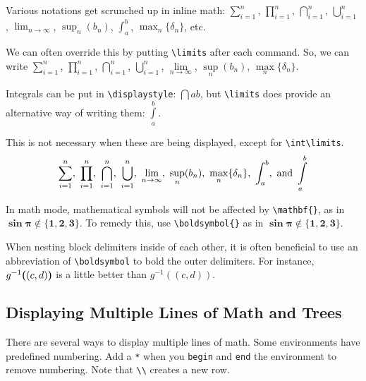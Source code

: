 \documentclass{article} 		%
\begin{document}
\begin{notation}
	Various notations get scrunched up in inline math: 
	$\sum_{i=1}^n$, 
	$\prod_{i=1}^n$, 
	$\bigcap_{i=1}^n$, 
	$\bigcup_{i=1}^n$, 
	$\lim_{n \to \infty}$, 
	$\sup_n (b_n)$, 
	$\int_a^b$, 
	$\max_n\{\delta_n\}$, etc. \par
	We can often override this by putting \verb$\limits$
	after each command.
	So, we can write 
	$\sum\limits_{i=1}^n$, 
	$\prod\limits_{i=1}^n$, 
	$\bigcap\limits_{i=1}^n$, 
	$\bigcup\limits_{i=1}^n$, 
	$\lim\limits_{n \to \infty}$,  
	$\sup\limits_n(b_n)$, 
	$\max\limits_n\{\delta_n\}$. \par
	Integrals can be put in \verb$\displaystyle$: $\dint{a}{b}$, but \verb$\limits$ does provide an alternative way of writing them: $\int\limits_a^b$. \par
	This is not necessary when these are being displayed, except for \verb$\int\limits$. 
	\[
		\sum_{i=1}^n,~ 
		\prod_{i=1}^n,~ 
		\bigcap_{i=1}^n,~ 
		\bigcup_{i=1}^n,~
		\lim_{n \to \infty},~
		\sup_n(b_n),~
		\max_n\{\delta_n\},~
		\int_a^b, \text{ and}\ 
		 \int\limits_a^b
	\]
\end{notation}

\begin{notation} \label{notation:bold}
	In math mode, mathematical symbols will not be affected by \verb$\mathbf{}$, as in $\mathbf{\sin\pi \notin \{1, 2, 3\}}$. To remedy this, use \verb$\boldsymbol{}$ as in $\boldsymbol{\sin\pi \notin \{1, 2, 3\}}$. \par
	When nesting block delimiters inside of each other, it is often beneficial to use an abbreviation of \verb$\boldsymbol$ to bold the outer delimiters. For instance, $g^{-1}\boldsymbol((c,d)\boldsymbol)$ is a little better than $g^{-1}((c,d))$. 
\end{notation}

\subsection{Displaying Multiple Lines of Math and Trees} \label{subsec:multiple-lines}
There are several ways to display multiple lines of math. Some environments have predefined numbering. Add a \texttt{*} when you \texttt{begin} and \texttt{end} the environment to remove numbering. Note that \verb$\\$ creates a new row. 
\end{document}
